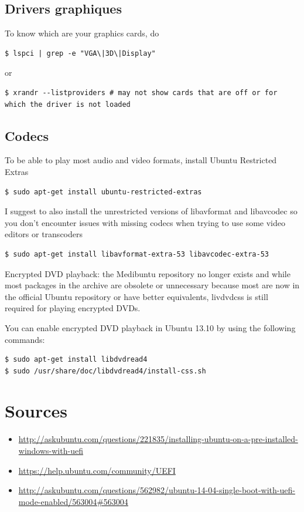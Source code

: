 \documentclass[fr]{../guide}
\begin{document}
\subsection{Drivers graphiques}
To know which are your graphics cards, do
\begin{verbatim}
$ lspci | grep -e "VGA\|3D\|Display"
\end{verbatim}
or
\begin{verbatim}
$ xrandr --listproviders # may not show cards that are off or for which the driver is not loaded
\end{verbatim}

\subsection{Codecs}
To be able to play most audio and video formats, install Ubuntu Restricted Extras
\begin{verbatim}
$ sudo apt-get install ubuntu-restricted-extras
\end{verbatim}

I suggest to also install the unrestricted versions of libavformat and libavcodec so you don't encounter issues with missing codecs when trying to use some video editors or transcoders
\begin{verbatim}
$ sudo apt-get install libavformat-extra-53 libavcodec-extra-53
\end{verbatim}

Encrypted DVD playback: the Medibuntu repository no longer exists and while most packages in the archive are obsolete or unnecessary because most are now in the official Ubuntu repository or have better equivalents, livdvdcss is still required for playing encrypted DVDs.

You can enable encrypted DVD playback in Ubuntu 13.10 by using the following commands:
\begin{verbatim}
$ sudo apt-get install libdvdread4
$ sudo /usr/share/doc/libdvdread4/install-css.sh
\end{verbatim}


\section*{Sources}
\begin{itemize}
  \item \url{http://askubuntu.com/questions/221835/installing-ubuntu-on-a-pre-installed-windows-with-uefi}
  \item \url{https://help.ubuntu.com/community/UEFI}
  \item \url{http://askubuntu.com/questions/562982/ubuntu-14-04-single-boot-with-uefi-mode-enabled/563004#563004}
\end{itemize}
\end{document}
